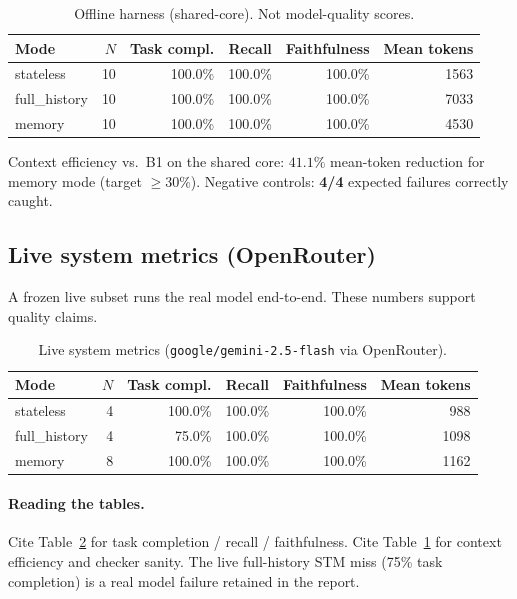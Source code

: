 \documentclass[11pt,a4paper]{article}
\begin{document}
\begin{table}[ht]
\centering
\caption{Offline harness (shared-core). Not model-quality scores.}
\label{tab:harness}
\begin{tabular}{@{}lrrrrr@{}}
\toprule
Mode & \(N\) & Task compl. & Recall & Faithfulness & Mean tokens \\
\midrule
stateless & 10 & 100.0\% & 100.0\% & 100.0\% & 1563 \\
full\_history & 10 & 100.0\% & 100.0\% & 100.0\% & 7033 \\
memory & 10 & 100.0\% & 100.0\% & 100.0\% & 4530 \\
\bottomrule
\end{tabular}
\end{table}

Context efficiency vs.\ B1 on the shared core: \(\mathbf{41.1\%}\) mean-token reduction for memory mode (target \(\ge 30\%\)). Negative controls: \textbf{4/4} expected failures correctly caught.

\subsection{Live system metrics (OpenRouter)}

A frozen live subset runs the real model end-to-end. These numbers support quality claims.

\begin{table}[ht]
\centering
\caption{Live system metrics (\texttt{google/gemini-2.5-flash} via OpenRouter).}
\label{tab:live}
\begin{tabular}{@{}lrrrrr@{}}
\toprule
Mode & \(N\) & Task compl. & Recall & Faithfulness & Mean tokens \\
\midrule
stateless & 4 & 100.0\% & 100.0\% & 100.0\% & 988 \\
full\_history & 4 & 75.0\% & 100.0\% & 100.0\% & 1098 \\
memory & 8 & 100.0\% & 100.0\% & 100.0\% & 1162 \\
\bottomrule
\end{tabular}
\end{table}

\paragraph{Reading the tables.}
Cite Table~\ref{tab:live} for task completion / recall / faithfulness. Cite Table~\ref{tab:harness} for context efficiency and checker sanity. The live full-history STM miss (75\% task completion) is a real model failure retained in the report.
\end{document}
